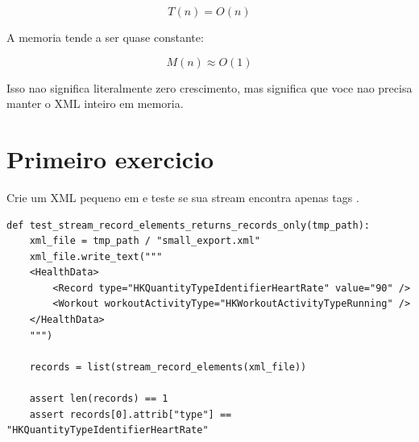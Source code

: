 \[
T(n) = O(n)
\]

A memoria tende a ser quase constante:

\[
M(n) \approx O(1)
\]

Isso nao significa literalmente zero crescimento, mas significa que voce nao precisa manter o XML inteiro em memoria.

\section{Primeiro exercicio}

Crie um XML pequeno em  e teste se sua stream encontra apenas tags .

\begin{lstlisting}[style=devbutterpython]
def test_stream_record_elements_returns_records_only(tmp_path):
    xml_file = tmp_path / "small_export.xml"
    xml_file.write_text("""
    <HealthData>
        <Record type="HKQuantityTypeIdentifierHeartRate" value="90" />
        <Workout workoutActivityType="HKWorkoutActivityTypeRunning" />
    </HealthData>
    """)

    records = list(stream_record_elements(xml_file))

    assert len(records) == 1
    assert records[0].attrib["type"] == "HKQuantityTypeIdentifierHeartRate"
\end{lstlisting}

